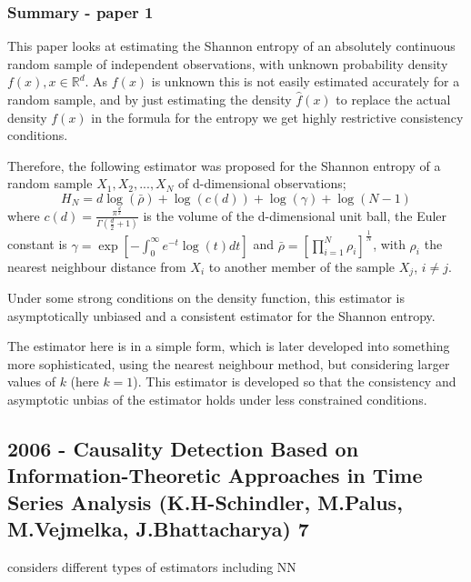 \documentclass{article}
\begin{document}
\subsubsection{Summary - paper 1}

This paper looks at estimating the Shannon entropy of an absolutely continuous random sample of independent observations, with unknown probability density $f(x), x \in \mathbb{R}^{d}$. As $f(x)$ is unknown this is not easily estimated accurately for a random sample, and by just estimating the density $\hat{f}(x)$ to replace the actual density $f(x)$ in the formula for the entropy we get highly restrictive consistency conditions. 

Therefore, the following estimator was proposed for the Shannon entropy of a random sample $X_{1}, X_{2}, ..., X_{N}$ of d-dimensional observations;
\begin{equation}
H_{N} = d \log(\bar{\rho } ) + \log (c(d)) + \log (\gamma) + \log (N-1)
\end{equation}
where $c(d) = \frac{\pi^{\frac{d}{2}}}{\Gamma ( \frac{d}{2} + 1 )}$ is the volume of the d-dimensional unit ball, the Euler constant is $\gamma = \exp \left[ - \int_{0}^{\infty} e^{-t} \log(t) dt \right]$ and $\bar{\rho} = \left[ \prod_{i=1}^{N} \rho_{i} \right]^{\frac{1}{N}}$, with $\rho_{i}$ the nearest neighbour distance from $X_{i}$ to another member of the sample $X_{j}$, $i \neq j$. 

Under some strong conditions on the density function, this estimator is asymptotically unbiased and a consistent estimator for the Shannon entropy. 

The estimator here is in a simple form, which is later developed into something more sophisticated, using the nearest neighbour method, but considering larger values of $k$ (here $k=1$). This estimator is developed so that the consistency and asymptotic unbias of the estimator holds under less constrained conditions.




 


\subsection{2006 - Causality Detection Based on Information-Theoretic Approaches in Time Series Analysis (K.H-Schindler, M.Palus, M.Vejmelka, J.Bhattacharya) 7}

considers different types of estimators including NN
\end{document}
